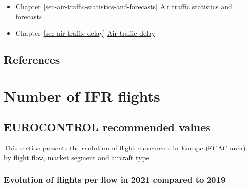\documentclass[
  11pt,
  a4paper,
]{book}
\begin{document}
\begin{itemize}
\item
  Chapter~\ref{sec-air-traffic-statistics-and-forecasts}
  \protect\hyperlink{sec-air-traffic-statistics-and-forecasts}{Air
  traffic statistics and forecasts}
\item
  Chapter~\ref{sec-air-traffic-delay}
  \protect\hyperlink{sec-air-traffic-delay}{Air traffic delay}
\end{itemize}

\hypertarget{references-2}{%
\section{References}\label{references-2}}

\hypertarget{sec-number-of-ifr-flights}{%
\chapter{Number of IFR flights}\label{sec-number-of-ifr-flights}}

\hypertarget{eurocontrol-recommended-values}{%
\section{EUROCONTROL recommended
values}\label{eurocontrol-recommended-values}}

This section presents the evolution of flight movements in Europe (ECAC
area) by flight flow, market segment and aircraft type.

\hypertarget{evolution-of-flights-per-flow-in-2021-compared-to-2019}{%
\subsection{Evolution of flights per flow in 2021 compared to
2019}\label{evolution-of-flights-per-flow-in-2021-compared-to-2019}}
\end{document}
